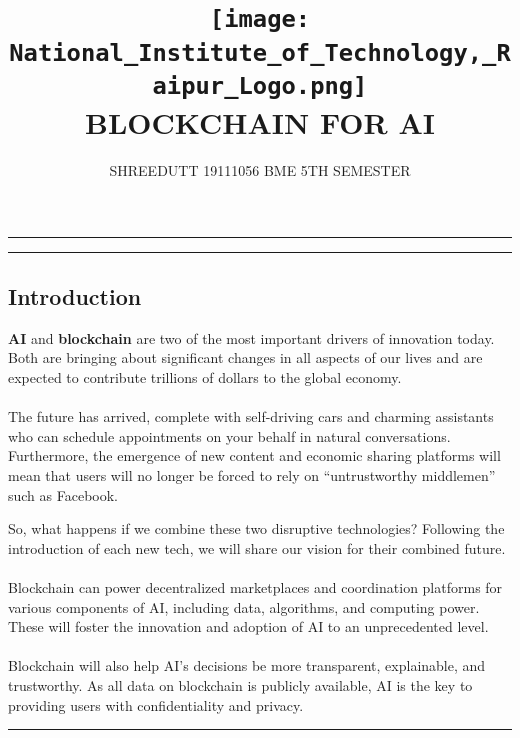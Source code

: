 \documentclass[12pt,letterpaper]{article}
\begin{document}
  \title{
  \texttt{[image: National\_Institute\_of\_Technology,\_Raipur\_Logo.png]}
  \\ 
  \textbf{BLOCKCHAIN FOR AI}
  }
  \author{SHREEDUTT 19111056 BME 5TH SEMESTER}
  \maketitle
  \rule{\textwidth}{0.1pt}
  \rule{\textwidth}{0.1pt}

  {\begin{center}
      \section* {Introduction}
  \end{center}} 
  \textbf{AI} and \textbf{blockchain} are two of the most important drivers of innovation today. Both are bringing about significant changes in all aspects of our lives and are expected to contribute trillions of dollars to the global economy. 
  \\
  \\
  The future has arrived, complete with self-driving cars and charming assistants who can schedule appointments on your behalf in natural conversations. Furthermore, the emergence of new content and economic sharing platforms will mean that users will no longer be forced to rely on “untrustworthy middlemen” such as Facebook. 

  \pagebreak

  So, what happens if we combine these two disruptive technologies? Following the introduction of each new tech, we will share our vision for their combined future.
  \\
  \\
  Blockchain can power decentralized marketplaces and coordination platforms for various components of AI, including data, algorithms, and computing power. These will foster the innovation and adoption of AI to an unprecedented level.
  \\ 
  \\
  Blockchain will also help AI’s decisions be more transparent, explainable, and trustworthy. As all data on blockchain is publicly available, AI is the key to providing users with confidentiality and privacy.

\pagebreak

  \hrule
\end{document}
